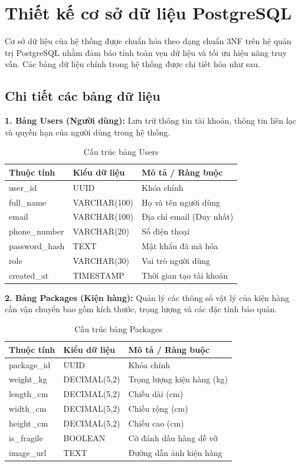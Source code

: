 \section{Thiết kế cơ sở dữ liệu PostgreSQL}
Cơ sở dữ liệu của hệ thống được chuẩn hóa theo dạng chuẩn 3NF trên hệ quản trị PostgreSQL nhằm đảm bảo tính toàn vẹn dữ liệu và tối ưu hiệu năng truy vấn. Các bảng dữ liệu chính trong hệ thống được chi tiết hóa như sau.

\subsection{Chi tiết các bảng dữ liệu}

\noindent\textbf{1. Bảng Users (Người dùng):} Lưu trữ thông tin tài khoản, thông tin liên lạc và quyền hạn của người dùng trong hệ thống.
\begin{table}[htbp]
	\centering
	\begin{tabular}{|l|l|l|}
		\hline
		\textbf{Thuộc tính} & \textbf{Kiểu dữ liệu} & \textbf{Mô tả / Ràng buộc} \\ \hline
		user\_id & UUID & Khóa chính \\ \hline
		full\_name & VARCHAR(100) & Họ và tên người dùng \\ \hline
		email & VARCHAR(100) & Địa chỉ email (Duy nhất) \\ \hline
		phone\_number & VARCHAR(20) & Số điện thoại \\ \hline
		password\_hash & TEXT & Mật khẩu đã mã hóa \\ \hline
		role & VARCHAR(30) & Vai trò người dùng \\ \hline
		created\_at & TIMESTAMP & Thời gian tạo tài khoản \\ \hline
	\end{tabular}
	\caption{Cấu trúc bảng Users}
\end{table}

\noindent\textbf{2. Bảng Packages (Kiện hàng):} Quản lý các thông số vật lý của kiện hàng cần vận chuyển bao gồm kích thước, trọng lượng và các đặc tính bảo quản.
\begin{table}[htbp]
	\centering
	\begin{tabular}{|l|l|l|}
		\hline
		\textbf{Thuộc tính} & \textbf{Kiểu dữ liệu} & \textbf{Mô tả / Ràng buộc} \\ \hline
		package\_id & UUID & Khóa chính \\ \hline
		weight\_kg & DECIMAL(5,2) & Trọng lượng kiện hàng (kg) \\ \hline
		length\_cm & DECIMAL(5,2) & Chiều dài (cm) \\ \hline
		width\_cm & DECIMAL(5,2) & Chiều rộng (cm) \\ \hline
		height\_cm & DECIMAL(5,2) & Chiều cao (cm) \\ \hline
		is\_fragile & BOOLEAN & Cờ đánh dấu hàng dễ vỡ \\ \hline
		image\_url & TEXT & Đường dẫn ảnh kiện hàng \\ \hline
	\end{tabular}
	\caption{Cấu trúc bảng Packages}
\end{table}


